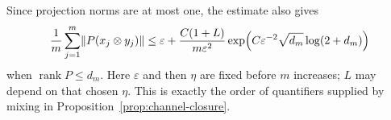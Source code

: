 Since projection norms are at most one, the estimate also gives
\begin{equation}\label{eq:packing-average}
 \frac1m\sum_{j=1}^m\lVert P(x_j\otimes y_j)\rVert
 \le\varepsilon+
 \frac{C(1+L)}{m\varepsilon^2}
 \exp\!\left(C\varepsilon^{-2}\sqrt{d_m}\log(2+d_m)\right)
\end{equation}
when $\operatorname{rank}P\le d_m$.  Here $\varepsilon$ and then
$\eta$ are fixed before $m$ increases; $L$ may depend on that chosen
$\eta$.  This is exactly the order of quantifiers supplied by mixing
in Proposition~\ref{prop:channel-closure}.
